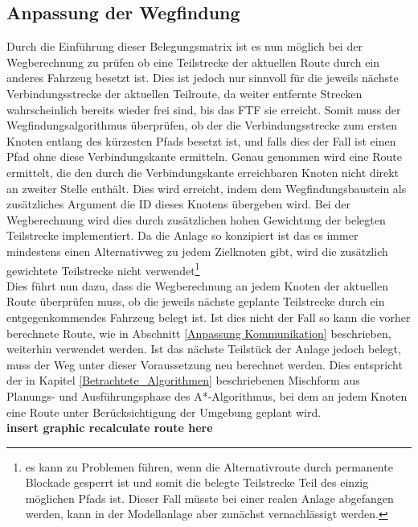 	\subsection{Anpassung der Wegfindung}
		Durch die Einführung dieser Belegungsmatrix ist es nun möglich bei der Wegberechnung zu prüfen ob eine Teilstrecke der aktuellen Route durch ein anderes Fahrzeug besetzt ist. Dies ist jedoch nur sinnvoll für die jeweils nächste Verbindungsstrecke der aktuellen Teilroute, da weiter entfernte Strecken wahrscheinlich bereits wieder frei sind, bis das \ac{FTF} sie erreicht. Somit muss der Wegfindungsalgorithmus überprüfen, ob der die Verbindungsstrecke zum ersten Knoten entlang des kürzesten Pfads besetzt ist, und falls dies der Fall ist einen Pfad ohne diese Verbindungskante ermitteln. Genau genommen wird eine Route ermittelt, die den durch die Verbindungskante erreichbaren Knoten nicht direkt an zweiter Stelle enthält.	Dies wird erreicht, indem dem Wegfindungsbaustein als zusätzliches Argument die ID dieses Knotens übergeben wird. Bei der Wegberechnung wird dies durch zusätzlichen hohen Gewichtung der belegten Teilstrecke implementiert. Da die Anlage so konzipiert ist das es immer mindestens einen Alternativweg zu jedem Zielknoten gibt, wird die zusätzlich gewichtete Teilstrecke nicht verwendet\footnote{es kann zu Problemen führen, wenn die Alternativroute durch permanente Blockade gesperrt ist und somit die belegte Teilstrecke Teil des einzig möglichen Pfads ist. Dieser Fall müsste bei einer realen Anlage abgefangen werden, kann in der Modellanlage aber zunächst vernachlässigt werden.} 
		\\
		Dies führt nun dazu, dass die Wegberechnung an jedem Knoten der aktuellen Route überprüfen muss, ob die jeweils nächste geplante Teilstrecke durch ein entgegenkommendes Fahrzeug belegt ist. Ist dies nicht der Fall so kann die vorher berechnete Route, wie in Abschnitt \ref{Anpassung Kommunikation} beschrieben, weiterhin verwendet werden. Ist das nächste Teilstück der Anlage jedoch belegt, muss der Weg unter dieser Voraussetzung neu berechnet werden. Dies entspricht der in Kapitel \ref{Betrachtete_Algorithmen} beschriebenen Mischform aus Planungs- und Ausführungsphase des A*-Algorithmus, bei dem an jedem Knoten eine Route unter Berücksichtigung der Umgebung geplant wird.
		\\ \textbf{insert graphic recalculate route here}
	
